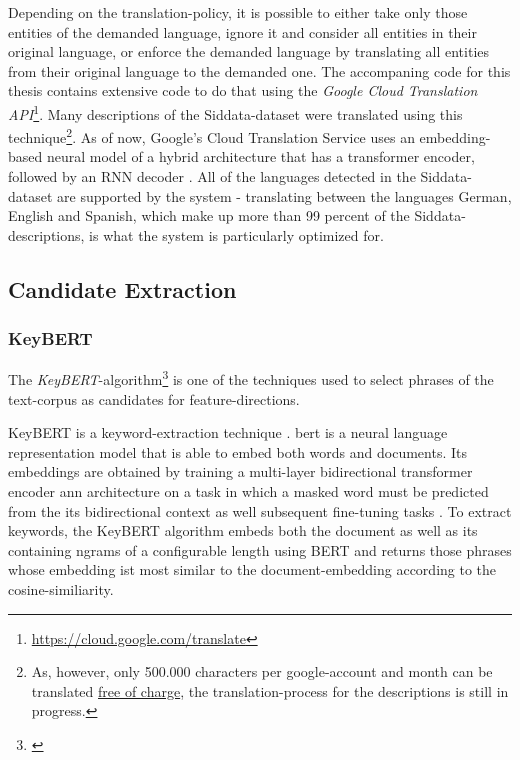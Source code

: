 Depending on the translation-policy, it is possible to either take only those entities of the demanded language, ignore it and consider all entities in their original language, or enforce the demanded language by translating all entities from their original language to the demanded one. The accompaning code for this thesis contains extensive code to do that using the \emph{Google Cloud Translation API}\footnote{\url{https://cloud.google.com/translate}}. Many descriptions of the Siddata-dataset were translated using this technique\footnote{As, however, only 500.000 characters per google-account and month can be translated \href{https://cloud.google.com/translate/pricing}{free of charge}, the translation-process for the descriptions is still in progress.}. As of now, Google's Cloud Translation Service uses an embedding-based neural model of a hybrid architecture that has a transformer encoder, followed by an RNN decoder \cite{Chen2018}. All of the languages detected in the Siddata-dataset are supported by the system - translating between the languages German, English and Spanish, which make up more than 99 percent of the Siddata-descriptions, is what the system is particularly optimized for. 


\subsection*{Candidate Extraction}

\subsubsection*{KeyBERT}
\label{ap:details_keybert}

The \emph{KeyBERT}-algorithm\footnote{\label{fnote:keybertgibhut}} \cite{grootendorst2020keybert} is one of the techniques used to select phrases of the text-corpus as candidates for feature-directions. 

KeyBERT is a keyword-extraction technique . \Gls{bert} is a neural language representation model that is able to embed both words and documents. Its embeddings are obtained by training a multi-layer bidirectional transformer encoder \gls{ann} architecture on a task in which a masked word must be predicted from the its bidirectional context as well subsequent fine-tuning tasks \cite{Devlin2019}. To extract keywords, the KeyBERT algorithm embeds both the document as well as its containing \glspl{ngram} of a configurable length using BERT and returns those phrases whose embedding ist most similar to the document-embedding according to the cosine-similiarity.

